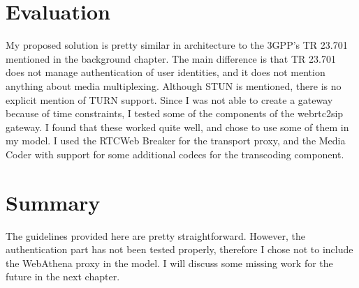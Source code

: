 \section{Evaluation}
My proposed solution is pretty similar in architecture to the 3GPP's TR 23.701\cite{3gpp-wrtc-access-ims} mentioned in the background chapter. The main difference is that TR 23.701 does not manage authentication of user identities, and it does not mention anything about media multiplexing. Although STUN is mentioned, there is no explicit mention of TURN support. Since I was not able to create a gateway because of time constraints, I tested some of the components of the webrtc2sip gateway. I found that these worked quite well, and chose to use some of them in my model. I used the RTCWeb Breaker for the transport proxy, and the Media Coder with support for some additional codecs for the transcoding component.

\section{Summary}
The guidelines provided here are pretty straightforward. However, the authentication part has not been tested properly, therefore I chose not to include the WebAthena proxy in the model. I will discuss some missing work for the future in the next chapter. 